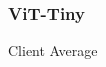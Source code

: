 \documentclass[letterpaper]{article}
\begin{document}
\subsubsection{ViT-Tiny}

Client Average


\end{document}
